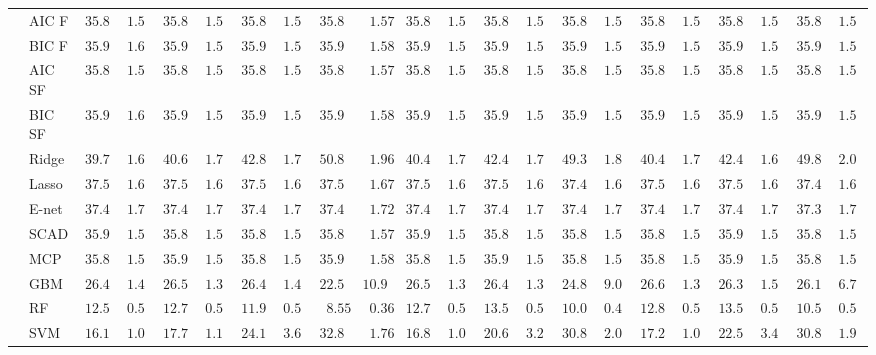 \begin{tabular}{ll|ll|llllll|llllll|llllll}
	& AIC F  & $35.83$ & $1.56$ & $35.82$ & $1.56$ & $35.83$ & $1.56$ & $35.84$ & $\phantom{0}1.57$ & $35.83$ & $1.56$ & $35.83$ & $1.56$ & $35.85$ & $1.56$ & $35.83$ & $1.56$ & $35.83$ & $1.57$ & $35.84$ & $1.56$ \\
	& BIC F  & $35.95$ & $1.60$ & $35.95$ & $1.57$ & $35.94$ & $1.57$ & $35.93$ & $\phantom{0}1.58$ & $35.93$ & $1.57$ & $35.95$ & $1.56$ & $35.94$ & $1.58$ & $35.94$ & $1.58$ & $35.95$ & $1.57$ & $35.95$ & $1.57$ \\
	& AIC SF  & $35.83$ & $1.56$ & $35.82$ & $1.56$ & $35.83$ & $1.56$ & $35.84$ & $\phantom{0}1.57$ & $35.83$ & $1.56$ & $35.83$ & $1.56$ & $35.85$ & $1.56$ & $35.83$ & $1.56$ & $35.83$ & $1.57$ & $35.84$ & $1.56$ \\
	& BIC SF  & $35.95$ & $1.60$ & $35.95$ & $1.57$ & $35.94$ & $1.57$ & $35.93$ & $\phantom{0}1.58$ & $35.93$ & $1.57$ & $35.95$ & $1.56$ & $35.94$ & $1.58$ & $35.94$ & $1.58$ & $35.95$ & $1.57$ & $35.95$ & $1.57$ \\
	& Ridge  & $39.78$ & $1.68$ & $40.64$ & $1.76$ & $42.89$ & $1.78$ & $50.87$ & $\phantom{0}1.96$ & $40.45$ & $1.73$ & $42.46$ & $1.73$ & $49.34$ & $1.89$ & $40.43$ & $1.70$ & $42.46$ & $1.68$ & $49.89$ & $2.00$ \\
	& Lasso  & $37.54$ & $1.68$ & $37.51$ & $1.67$ & $37.51$ & $1.66$ & $37.51$ & $\phantom{0}1.67$ & $37.52$ & $1.66$ & $37.50$ & $1.66$ & $37.46$ & $1.66$ & $37.52$ & $1.66$ & $37.50$ & $1.67$ & $37.44$ & $1.67$ \\
	& E-net  & $37.48$ & $1.75$ & $37.46$ & $1.71$ & $37.45$ & $1.71$ & $37.44$ & $\phantom{0}1.72$ & $37.46$ & $1.73$ & $37.44$ & $1.73$ & $37.40$ & $1.71$ & $37.46$ & $1.73$ & $37.44$ & $1.71$ & $37.38$ & $1.73$ \\
	& SCAD  & $35.90$ & $1.57$ & $35.89$ & $1.58$ & $35.89$ & $1.57$ & $35.88$ & $\phantom{0}1.57$ & $35.90$ & $1.57$ & $35.88$ & $1.58$ & $35.87$ & $1.57$ & $35.89$ & $1.58$ & $35.90$ & $1.58$ & $35.89$ & $1.58$ \\
	& MCP  & $35.89$ & $1.57$ & $35.90$ & $1.58$ & $35.89$ & $1.58$ & $35.90$ & $\phantom{0}1.58$ & $35.89$ & $1.57$ & $35.91$ & $1.58$ & $35.88$ & $1.58$ & $35.89$ & $1.57$ & $35.90$ & $1.57$ & $35.88$ & $1.56$ \\
	& GBM  & $26.42$ & $1.46$ & $26.50$ & $1.30$ & $26.47$ & $1.43$ & $22.57$ & $10.98$ & $26.52$ & $1.35$ & $26.43$ & $1.39$ & $24.88$ & $9.02$ & $26.62$ & $1.33$ & $26.37$ & $1.56$ & $26.19$ & $6.76$ \\
	& RF  & $12.54$ & $0.51$ & $12.79$ & $0.56$ & $11.97$ & $0.54$ & $\phantom{0}8.55$ & $\phantom{0}0.36$ & $12.75$ & $0.50$ & $13.53$ & $0.52$ & $10.04$ & $0.45$ & $12.83$ & $0.53$ & $13.57$ & $0.56$ & $10.55$ & $0.50$ \\
	& SVM  & $16.16$ & $1.04$ & $17.72$ & $1.11$ & $24.16$ & $3.62$ & $32.84$ & $\phantom{0}1.76$ & $16.81$ & $1.08$ & $20.60$ & $3.25$ & $30.84$ & $2.09$ & $17.26$ & $1.03$ & $22.55$ & $3.45$ & $30.80$ & $1.94$ \\
	\hline 
\end{tabular}
